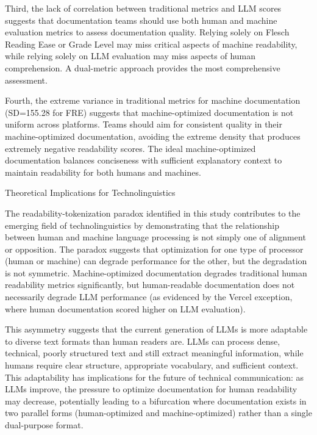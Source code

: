\documentclass[10pt,conference,a4paper]{IEEEtran}
\makeatletter
\let\oldsubsection\subsection
\renewcommand{\subsection}{%
    \@ifstar{\subsectionStar}{\subsectionNoStar}%
}
\newcommand{\subsectionStar}[1]{%
    \oldsubsection*{\textit{#1}}%
    \vspace{-3pt}%
}
\newcommand{\subsectionNoStar}[1]{%
    \oldsubsection{\textit{#1}}%
    \vspace{-3pt}%
}
\makeatother
\begin{document}
Third, the lack of correlation between traditional metrics and LLM scores suggests that documentation teams should use both human and machine evaluation metrics to assess documentation quality. Relying solely on Flesch Reading Ease or Grade Level may miss critical aspects of machine readability, while relying solely on LLM evaluation may miss aspects of human comprehension. A dual-metric approach provides the most comprehensive assessment.

Fourth, the extreme variance in traditional metrics for machine documentation (SD=155.28 for FRE) suggests that machine-optimized documentation is not uniform across platforms. Teams should aim for consistent quality in their machine-optimized documentation, avoiding the extreme density that produces extremely negative readability scores. The ideal machine-optimized documentation balances conciseness with sufficient explanatory context to maintain readability for both humans and machines.

\subsection{Theoretical Implications for Technolinguistics}

The readability-tokenization paradox identified in this study contributes to the emerging field of technolinguistics by demonstrating that the relationship between human and machine language processing is not simply one of alignment or opposition. The paradox suggests that optimization for one type of processor (human or machine) can degrade performance for the other, but the degradation is not symmetric. Machine-optimized documentation degrades traditional human readability metrics significantly, but human-readable documentation does not necessarily degrade LLM performance (as evidenced by the Vercel exception, where human documentation scored higher on LLM evaluation).

This asymmetry suggests that the current generation of LLMs is more adaptable to diverse text formats than human readers are. LLMs can process dense, technical, poorly structured text and still extract meaningful information, while humans require clear structure, appropriate vocabulary, and sufficient context. This adaptability has implications for the future of technical communication: as LLMs improve, the pressure to optimize documentation for human readability may decrease, potentially leading to a bifurcation where documentation exists in two parallel forms (human-optimized and machine-optimized) rather than a single dual-purpose format.
\end{document}
